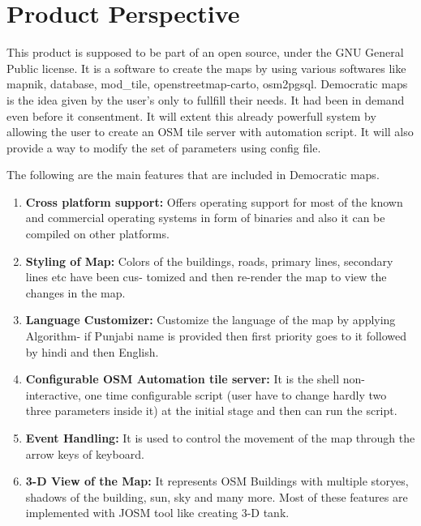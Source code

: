 \section{Product Perspective}
   
This product is supposed to be part of an open source, under the GNU General Public license. It is a software to create the maps by using various softwares like mapnik, database, mod\_tile, openstreetmap-carto, osm2pgsql. Democratic maps is the idea given by the user's only to fullfill their needs. It had been in demand even before it consentment. It will extent this already powerfull system by allowing the user to create an OSM tile server with automation script. It will also provide a way to modify the set of parameters using config file.
   
The following are the main features that are included in Democratic maps.

\begin{enumerate}
    \item \textbf{Cross platform support:} Offers operating support for most of the known and commercial operating systems in form of binaries and also it can be compiled on other platforms.
   
    \item \textbf{Styling of Map:} Colors of the buildings, roads, primary lines, secondary lines etc have been cus-
	    tomized and then re-render the map to view the changes in the map.
   
    \item \textbf{Language Customizer:} Customize the language of the map by applying Algorithm- if Punjabi name is
	    provided then first priority goes to it followed by hindi and then English.
   
    \item \textbf{Configurable OSM Automation tile server:} It is the shell non- interactive, one time configurable script (user have to
	    change hardly two three parameters inside it) at the initial stage and then can run the script.
   
   
    \item \textbf{Event Handling:} It is used to control the movement of the map through the arrow keys of
	    keyboard.
    
    \item \textbf{3-D View of the Map:} It represents OSM Buildings with
	    multiple storyes, shadows of the building, sun, sky and many more. Most of these features
		are implemented with JOSM tool like creating 3-D tank.
   
\end{enumerate}  
